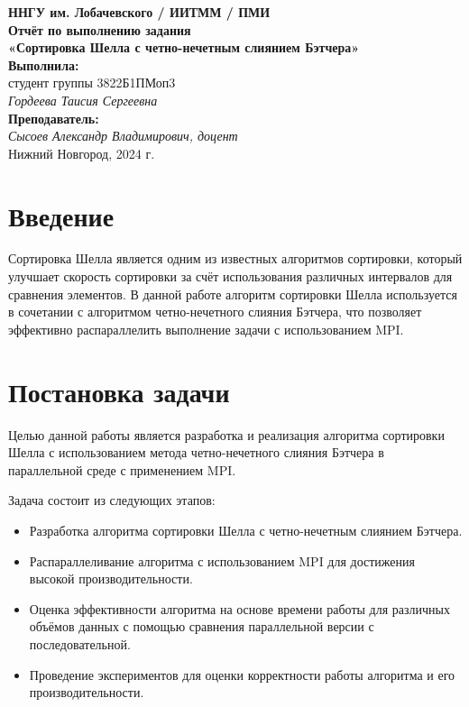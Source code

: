 \documentclass[a4paper,12pt]{article}
\begin{document}
\begin{titlepage}
\begin{center}
    \large
    \textbf{ННГУ им. Лобачевского / ИИТММ / ПМИ}\\[0.5cm]

    \vspace{4cm}
    \textbf{\Large Отчёт по выполнению задания}\\
    \textbf{\large «Сортировка Шелла с четно-нечетным слиянием Бэтчера»}\\[3cm]

    \vspace{3cm}
    \textbf{Выполнила:}\\
    студент группы 3822Б1ПМоп3 \\
    \textit{Гордеева Таисия Сергеевна}\\[1cm]

    \textbf{Преподаватель:}\\
    \textit{Сысоев Александр Владимирович, доцент}\\[2cm]

    Нижний Новгород, 2024 г.
\end{center}
\end{titlepage}

\tableofcontents
\newpage

\section{Введение}
Сортировка Шелла является одним из известных алгоритмов сортировки, который улучшает скорость сортировки за счёт использования различных интервалов для сравнения элементов. В данной работе алгоритм сортировки Шелла используется в сочетании с алгоритмом четно-нечетного слияния Бэтчера, что позволяет эффективно распараллелить выполнение задачи с использованием MPI.

\section{Постановка задачи}
Целью данной работы является разработка и реализация алгоритма сортировки Шелла с использованием метода четно-нечетного слияния Бэтчера в параллельной среде с применением MPI.

Задача состоит из следующих этапов:
\begin{itemize}
    \item Разработка алгоритма сортировки Шелла с четно-нечетным слиянием Бэтчера.
    \item Распараллеливание алгоритма с использованием MPI для достижения высокой производительности.
    \item Оценка эффективности алгоритма на основе времени работы для различных объёмов данных с помощью сравнения параллельной версии с последовательной.
    \item Проведение экспериментов для оценки корректности работы алгоритма и его производительности.
\end{itemize}
\newpage
\end{document}
